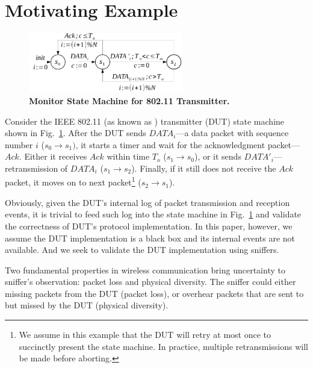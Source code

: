 \section{Motivating Example}
\label{sec:motivation}

\begin{figure}[h!]
  \vspace*{\beforecaptionskip}
  \centering
  \includegraphics[width=0.6\textwidth]{./figures/dot11_tx_ta.pdf}
  \caption{\textbf{Monitor State Machine for 802.11 Transmitter.}}
  \label{fig:dot11_tx_ta}
  \vspace*{\aftercaptionskip}
\end{figure}

Consider the IEEE 802.11 (as known as \wifi{}) transmitter (DUT) state machine
shown in Fig.~\ref{fig:dot11_tx_ta}. After the DUT sends $DATA_i$---a data
packet with sequence number $i$ ($s_0\rightarrow s_1)$, it starts a timer and
wait for the acknowledgment packet---$Ack$. Either it receives $Ack$ within time
$T_o$ ($s_1\rightarrow s_0$), or it sends $DATA'_i$---retransmission of $DATA_i$
($s_1\rightarrow s_2$). Finally, if it still does not receive the $Ack$ packet,
it moves on to next packet\footnote{We assume in this example that the DUT will
retry at most once to succinctly present the state machine.  In practice,
multiple retransmissions will be made before aborting.} ($s_2\rightarrow s_1$).

Obviously, given the DUT's internal log of packet transmission and reception
events, it is trivial to feed such log into the state machine in
Fig.~\ref{fig:dot11_tx_ta} and validate the correctness of DUT's protocol
implementation. In this paper, however, we assume the DUT implementation is a
black box and its internal events are not available. And we seek to validate the
DUT implementation using sniffers.

Two fundamental properties in wireless communication bring uncertainty
to sniffer's observation: packet loss and physical diversity. The sniffer could
either missing packets from the DUT (packet loss), or overhear packets that are
sent to but missed by the DUT (physical diversity).

